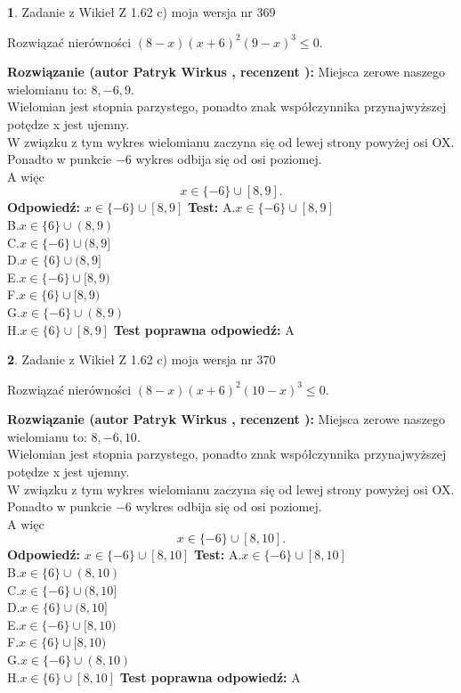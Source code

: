 \documentclass[12pt, a4paper]{article}
\theoremstyle{definition} %
\newtheorem{zad}{}
\newcommand{\zadStart}[1]{\begin{zad}#1\newline}
\newcommand{\zadStop}{\end{zad}}
\newcommand{\rozwStart}[2]{\noindent \textbf{Rozwiązanie (autor #1 , recenzent #2): }\newline}
\newcommand{\rozwStop}{\newline}
\newcommand{\odpStart}{\noindent \textbf{Odpowiedź:}\newline}
\newcommand{\odpStop}{\newline}
\newcommand{\testStart}{\noindent \textbf{Test:}\newline}
\newcommand{\testStop}{\newline}
\newcommand{\kluczStart}{\noindent \textbf{Test poprawna odpowiedź:}\newline}
\newcommand{\kluczStop}{\newline}
\begin{document}
\zadStart{Zadanie z Wikieł Z 1.62 c) moja wersja nr 369}

Rozwiązać nierówności $(8-x)(x+6)^{2}(9-x)^{3}\le0$.
\zadStop
\rozwStart{Patryk Wirkus}{}
Miejsca zerowe naszego wielomianu to: $8, -6, 9$.\\
Wielomian jest stopnia parzystego, ponadto znak współczynnika przy\linebreak najwyższej potędze x jest ujemny.\\ W związku z tym wykres wielomianu zaczyna się od lewej strony powyżej osi OX.\\
Ponadto w punkcie $-6$ wykres odbija się od osi poziomej.\\
A więc $$x \in \{-6\} \cup [8,9].$$
\rozwStop
\odpStart
$x \in \{-6\} \cup [8,9]$
\odpStop
\testStart
A.$x \in \{-6\} \cup [8,9]$\\
B.$x \in \{6\} \cup (8,9)$\\
C.$x \in \{-6\} \cup (8,9]$\\
D.$x \in \{6\} \cup (8,9]$\\
E.$x \in \{-6\} \cup [8,9)$\\
F.$x \in \{6\} \cup [8,9)$\\
G.$x \in \{-6\} \cup (8,9)$\\
H.$x \in \{6\} \cup [8,9]$
\testStop
\kluczStart
A
\kluczStop



\zadStart{Zadanie z Wikieł Z 1.62 c) moja wersja nr 370}

Rozwiązać nierówności $(8-x)(x+6)^{2}(10-x)^{3}\le0$.
\zadStop
\rozwStart{Patryk Wirkus}{}
Miejsca zerowe naszego wielomianu to: $8, -6, 10$.\\
Wielomian jest stopnia parzystego, ponadto znak współczynnika przy\linebreak najwyższej potędze x jest ujemny.\\ W związku z tym wykres wielomianu zaczyna się od lewej strony powyżej osi OX.\\
Ponadto w punkcie $-6$ wykres odbija się od osi poziomej.\\
A więc $$x \in \{-6\} \cup [8,10].$$
\rozwStop
\odpStart
$x \in \{-6\} \cup [8,10]$
\odpStop
\testStart
A.$x \in \{-6\} \cup [8,10]$\\
B.$x \in \{6\} \cup (8,10)$\\
C.$x \in \{-6\} \cup (8,10]$\\
D.$x \in \{6\} \cup (8,10]$\\
E.$x \in \{-6\} \cup [8,10)$\\
F.$x \in \{6\} \cup [8,10)$\\
G.$x \in \{-6\} \cup (8,10)$\\
H.$x \in \{6\} \cup [8,10]$
\testStop
\kluczStart
A
\kluczStop
\end{document}
